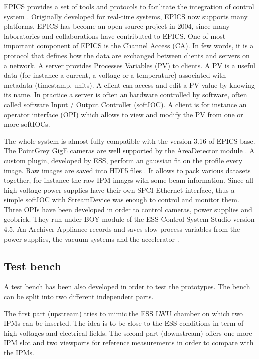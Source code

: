 \begin{refsection}
  EPICS provides a set of tools and protocols to facilitate the integration of control system \cite{epics2019}. Originally developed for real-time systems, EPICS now supports many platforms. EPICS has become an open source project in 2004, since many laboratories and collaborations have contributed to EPICS.
  One of most important component of EPICS is the Channel Access (CA). In few words, it is a protocol that defines how the data are exchanged between clients and servers on a network. A server provides Processes Variables (PV) to clients. A PV is a useful data (for instance a current, a voltage or a temperature) associated with metadata (timestamp, units). A client can access and edit a PV value by knowing its name. In practice a server is often an hardware controlled by software, often called software Input / Output Controller (softIOC). A client is for instance an operator interface (OPI) which allows to view and modify the PV from one or more softIOCs.

  The whole system is almost fully compatible with the version 3.16 of EPICS base. The PointGrey GigE cameras are well supported by the AreaDetector module \cite{ad2019}. A custom plugin, developed by ESS, perform an gaussian fit on the profile every image. Raw images are saved into HDF5 files \cite{hdf5}. It allows to pack  various datasets together, for instance the raw IPM images with some beam information.
  Since all high voltage power supplies have their own SPCI Ethernet interface, thus a simple softIOC with StreamDevice\cite{streamdevice2019} was enough to control and monitor them.
  Three OPIs have been developed in order to control cameras, power supplies and geobrick. They run under BOY module of the ESS Control System Studio version 4.5. An Archiver Appliance records and saves slow process variables from the power supplies, the vacuum systems and the accelerator \cite{archiver2019}.

  

  \subsection{Test bench}
  A test bench has been also developed in order to test the prototypes. The bench can be split into two different independent parts.

  The first part (upstream) tries to mimic the ESS LWU chamber on which two IPMs can be inserted. The idea is to be close to the ESS conditions in term of high voltages and electrical fields.
  The second part (downstream) offers one more IPM slot and two viewports for reference measurements in order to compare with the IPMs.


\end{refsection}
